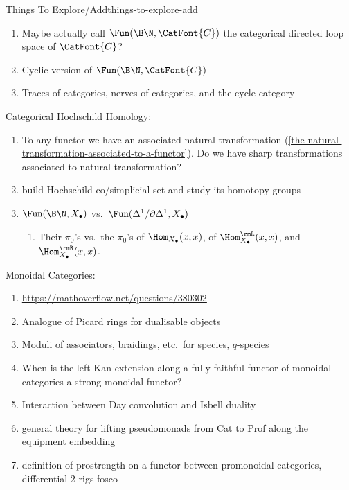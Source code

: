 \begin{remark}{Things To Explore/Add}{things-to-explore-add}
\begin{enumerate}
            \begin{enumerate}
                \item properties, functoriality, etc.
            \end{enumerate}
        \item Maybe actually call $\Fun(\B\N,\CatFont{C})$ the categorical directed loop space of $\CatFont{C}$?
        \item Cyclic version of $\Fun(\B\N,\CatFont{C})$
        \item Traces of categories, nerves of categories, and the cycle category
    \end{enumerate}
    Categorical Hochschild Homology:
    \begin{enumerate}
        \item To any functor we have an associated natural transformation (\cref{the-natural-transformation-associated-to-a-functor}). Do we have sharp transformations associated to natural transformation?
        \item build Hochschild co/simplicial set and study its homotopy groups
        \item $\Fun(\B\N,X_{\bullet})$ vs.\ $\Fun(\Delta^{1}/\partial\Delta^{1},X_{\bullet})$
            \begin{enumerate}
                \item Their $\pi_{0}$'s vs.\ the $\pi_{0}$'s of $\Hom_{X_{\bullet}}(x,x)$, of $\Hom^{\rmL}_{X_{\bullet}}(x,x)$, and $\Hom^{\rmR}_{X_{\bullet}}(x,x)$.
            \end{enumerate}
    \end{enumerate}
    Monoidal Categories:
    \begin{enumerate}
        \item \url{https://mathoverflow.net/questions/380302}
        \item Analogue of Picard rings for dualisable objects
        \item Moduli of associators, braidings, etc.\ for species, $q$-species
        \item When is the left Kan extension along a fully faithful functor of monoidal categories a strong monoidal functor?
        \item Interaction between Day convolution and Isbell duality
        \item general theory for lifting pseudomonads from Cat to Prof along the equipment embedding
        \item definition of prostrength on a functor between promonoidal categories, differential 2-rigs fosco

\end{enumerate}
\end{remark}

